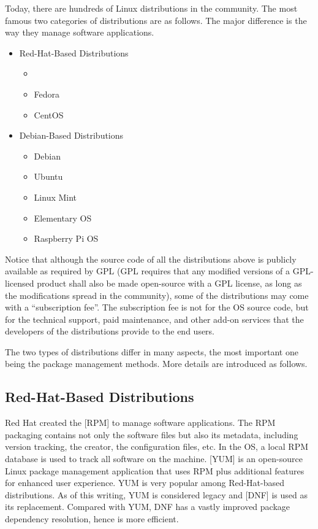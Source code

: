 Today, there are hundreds of Linux distributions in the community. The most famous two categories of distributions are as follows. The major difference is the way they manage software applications.
\begin{itemize}
  \item Red-Hat-Based Distributions
  \begin{itemize}
    \item {}
    \item Fedora
    \item CentOS
  \end{itemize}
  \item Debian-Based Distributions
  \begin{itemize}
    \item Debian
    \item Ubuntu
    \item Linux Mint
    \item Elementary OS
    \item Raspberry Pi OS
  \end{itemize}
\end{itemize}

Notice that although the source code of all the distributions above is publicly available as required by GPL (GPL requires that any modified versions of a GPL-licensed product shall also be made open-source with a GPL license, as long as the modifications spread in the community), some of the distributions may come with a ``subscription fee''. The subscription fee is not for the OS source code, but for the technical support, paid maintenance, and other add-on services that the developers of the distributions provide to the end users.

The two types of distributions differ in many aspects, the most important one being the package management methods. More details are introduced as follows.

\subsection{Red-Hat-Based Distributions}

Red Hat created the [RPM] to manage software applications. The RPM packaging contains not only the software files but also its metadata, including version tracking, the creator, the configuration files, etc. In the OS, a local RPM database is used to track all software on the machine. [YUM] is an open-source Linux package management application that uses RPM plus additional features for enhanced user experience. YUM is very popular among Red-Hat-based distributions. As of this writing, YUM is considered legacy and [DNF] is used as its replacement. Compared with YUM, DNF has a vastly improved package dependency resolution, hence is more efficient.


